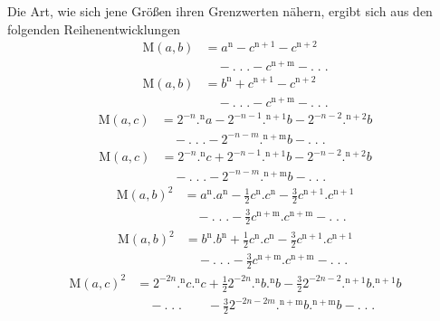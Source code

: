 \par Die Art, wie sich jene Größen ihren Grenzwerten nähern, ergibt sich aus den folgenden Reihenentwicklungen
\[
\begin{aligned}\mathrm{M}(a,b)&=a^{\mathrm{n}}-c^{\mathrm{n}+1}-c^{\mathrm{n}+2}\\&\quad-.\;.\;.-c^{\mathrm{n}+\mathrm{m}}-.\;.\;.\end{aligned}
\]
\[
\begin{aligned}\mathrm{M}(a,b)&=b^{\mathrm{n}}+c^{\mathrm{n}+1}-c^{\mathrm{n}+2}\\&\quad-.\;.\;.-c^{\mathrm{n}+\mathrm{m}}-.\;.\;.\end{aligned}
\]
\[
\begin{aligned}\mathrm{M}(a,c)&=2^{-n}.{}^{\mathrm{n}}a-2^{-n-1}.{}^{\mathrm{n}+1}b-2^{-n-2}.{}^{\mathrm{n}+2}b\\&\quad-.\;.\;.-2^{-n-m}.{}^{\mathrm{n}+\mathrm{m}}b-.\;.\;.\end{aligned}
\]
\[
\begin{aligned}\mathrm{M}(a,c)&=2^{-n}.{}^{\mathrm{n}}c+2^{-n-1}.{}^{\mathrm{n}+1}b-2^{-n-2}.{}^{\mathrm{n}+2}b\\&\quad-.\;.\;.-2^{-n-m}.{}^{\mathrm{n}+\mathrm{m}}b-.\;.\;.\end{aligned}
\]
\[
\begin{aligned}\mathrm{M}(a,b)^2&=a^{\mathrm{n}}.a^{\mathrm{n}}-\frac12c^{\mathrm{n}}.c^{\mathrm{n}}-\frac32c^{\mathrm{n}+1}.c^{\mathrm{n}+1}\\&\quad-.\;.\;.-\frac32c^{\mathrm{n}+\mathrm{m}}.c^{\mathrm{n}+\mathrm{m}}-.\;.\;.\end{aligned}
\]
\[
\begin{aligned}\mathrm{M}(a,b)^2&=b^{\mathrm{n}}.b^{\mathrm{n}}+\frac12c^{\mathrm{n}}.c^{\mathrm{n}}-\frac32c^{\mathrm{n}+1}.c^{\mathrm{n}+1}\\&\quad-.\;.\;.-\frac32c^{\mathrm{n}+\mathrm{m}}.c^{\mathrm{n}+\mathrm{m}}-.\;.\;.\end{aligned}
\]
\[
\begin{aligned}\mathrm{M}(a,c)^2&=2^{-2n}.{}^{\mathrm{n}}c.{}^{\mathrm{n}}c+\frac12 2^{-2n}.{}^{\mathrm{n}}b.{}^{\mathrm{n}}b-\frac32 2^{-2n-2}.{}^{\mathrm{n}+1}b.{}^{\mathrm{n}+1}b\\&\quad-.\;.\;.\qquad-\frac32 2^{-2n-2m}.{}^{\mathrm{n}+\mathrm{m}}b.{}^{\mathrm{n}+\mathrm{m}}b-.\;.\;.\end{aligned}
\]
